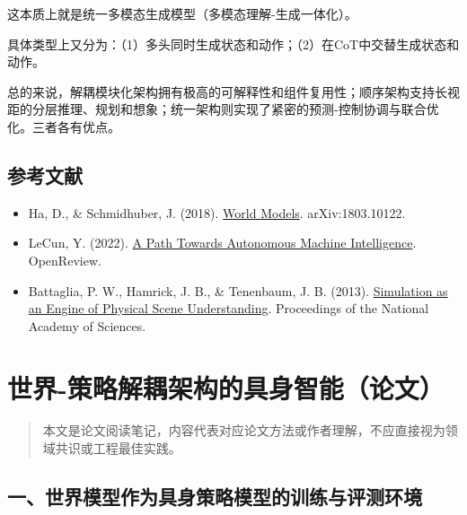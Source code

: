 这本质上就是统一多模态生成模型（多模态理解-生成一体化）。

具体类型上又分为：（1）多头同时生成状态和动作；（2）在CoT中交替生成状态和动作。

总的来说，解耦模块化架构拥有极高的可解释性和组件复用性；顺序架构支持长视距的分层推理、规划和想象；统一架构则实现了紧密的预测-控制协调与联合优化。三者各有优点。

\hypertarget{ux53c2ux8003ux6587ux732e-203}{%
\subsection{参考文献}\label{ux53c2ux8003ux6587ux732e-203}}

\begin{itemize}
\tightlist
\item
  Ha, D., \& Schmidhuber, J. (2018). \href{https://arxiv.org/abs/1803.10122}{World Models}. arXiv:1803.10122.
\item
  LeCun, Y. (2022). \href{https://openreview.net/forum?id=BZ5a1r-kVsf}{A Path Towards Autonomous Machine Intelligence}. OpenReview.
\item
  Battaglia, P. W., Hamrick, J. B., \& Tenenbaum, J. B. (2013). \href{https://www.pnas.org/doi/10.1073/pnas.1306572110}{Simulation as an Engine of Physical Scene Understanding}. Proceedings of the National Academy of Sciences.
\end{itemize}

\clearpage

\hypertarget{ux4e16ux754c-ux7b56ux7565ux89e3ux8026ux67b6ux6784ux7684ux5177ux8eabux667aux80fdux8bbaux6587}{%
\section{世界-策略解耦架构的具身智能（论文）}\label{ux4e16ux754c-ux7b56ux7565ux89e3ux8026ux67b6ux6784ux7684ux5177ux8eabux667aux80fdux8bbaux6587}}

\begin{quote}
本文是论文阅读笔记，内容代表对应论文方法或作者理解，不应直接视为领域共识或工程最佳实践。
\end{quote}

\hypertarget{ux4e00ux4e16ux754cux6a21ux578bux4f5cux4e3aux5177ux8eabux7b56ux7565ux6a21ux578bux7684ux8badux7ec3ux4e0eux8bc4ux6d4bux73afux5883}{%
\subsection{一、世界模型作为具身策略模型的训练与评测环境}\label{ux4e00ux4e16ux754cux6a21ux578bux4f5cux4e3aux5177ux8eabux7b56ux7565ux6a21ux578bux7684ux8badux7ec3ux4e0eux8bc4ux6d4bux73afux5883}}

